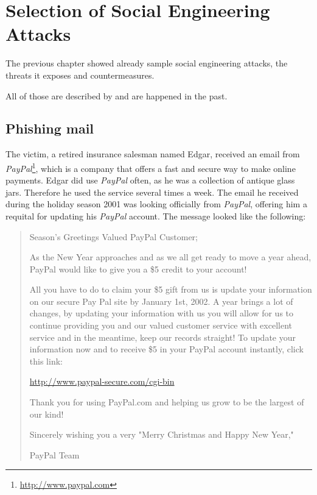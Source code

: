 \chapter{Selection of Social Engineering Attacks}
\label{chapter:attacks}

The previous chapter showed already sample social engineering attacks, the
threats it exposes and countermeasures. 


All of those are described by \cite{mitnick2003}
and are happened in the past.

\section{Phishing mail}
\label{sec:phishing_mail}

The victim, a retired insurance salesman named Edgar, received an email from
\textit{PayPal}\footnote{\url{http://www.paypal.com}}, which is a company that
offers a fast and secure way to make online payments. Edgar did use
\textit{PayPal} often, as he was a collection of antique glass jars. Therefore
he used the service several times a week. The email he received during the
holiday season 2001 was looking officially
from \textit{PayPal}, offering him a requital for updating his
\textit{PayPal} account. The message looked like the following:

\begin{quote}
Season's Greetings Valued PayPal Customer;

As the New Year approaches and as we all get ready to move a year ahead,
PayPal would like to give you a \$5 credit to your account!

All you have to do to claim your \$5 gift from us is update your information on
our secure Pay Pal site by January 1st, 2002. A year brings a lot of changes,
by updating your information with us you will allow for us to continue
providing you and our valued customer service with excellent service and in the
meantime, keep our records straight! To update your information now and to
receive \$5 in your PayPal account instantly, click this link:

\url{http://www.paypal-secure.com/cgi-bin}

Thank you for using PayPal.com and helping us grow to be the largest of our
kind!

Sincerely wishing you a very "Merry Christmas and Happy New Year,"

PayPal Team

\end{quote}

